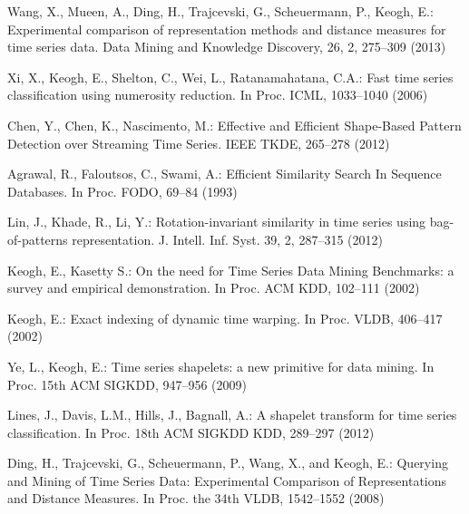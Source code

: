\documentclass{llncs}
\begin{document}
%
%
\enlargethispage{0.5cm} 
\begin{thebibliography}{5}


Wang, X., Mueen, A., Ding, H., Trajcevski, G., Scheuermann, P., Keogh, E.:
Experimental comparison of representation methods and distance measures for time series data.
Data Mining and Knowledge Discovery, 26, 2, 275--309 (2013)

Xi, X., Keogh, E., Shelton, C., Wei, L., Ratanamahatana, C.A.:
Fast time series classification using numerosity reduction. 
In Proc. ICML, 1033--1040 (2006)

Chen, Y., Chen, K., Nascimento, M.:
Effective and Efficient Shape-Based Pattern Detection over Streaming Time Series. 
IEEE TKDE, 265--278 (2012)

Agrawal, R., Faloutsos, C., Swami, A.:
Efficient Similarity Search In Sequence Databases.
In Proc. FODO, 69--84 (1993)

Lin, J., Khade, R., Li, Y.:
Rotation-invariant similarity in time series using bag-of-patterns representation. 
J. Intell. Inf. Syst. 39, 2, 287--315 (2012)

Keogh, E., Kasetty S.:
On the need for Time Series Data Mining Benchmarks: a survey and empirical demonstration.
In Proc. ACM KDD, 102--111 (2002)

Keogh, E.:
Exact indexing of dynamic time warping. 
In Proc. VLDB, 406--417 (2002)

Ye, L., Keogh, E.:
Time series shapelets: a new primitive for data mining.
In Proc. 15th ACM SIGKDD, 947--956 (2009)


Lines, J., Davis, L.M., Hills, J., Bagnall, A.:
A shapelet transform for time series classification. 
In Proc. 18th ACM SIGKDD KDD, 289--297 (2012)

Ding, H., Trajcevski, G., Scheuermann, P., Wang, X., and Keogh, E.:
Querying and Mining of Time Series Data: Experimental Comparison of Representations and Distance
Measures. 
In Proc. the 34th VLDB, 1542--1552 (2008)


\end{thebibliography}
\end{document}
